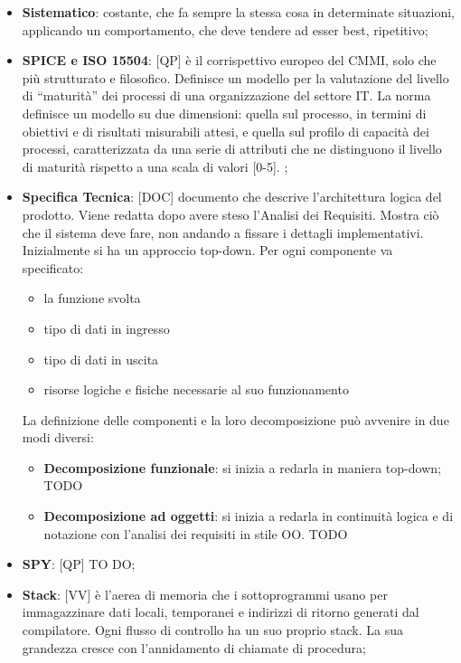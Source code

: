 \begin{itemize}
	\item \textbf{Sistematico}: costante, che fa sempre la stessa cosa in determinate situazioni, applicando un comportamento, che deve tendere ad esser best, ripetitivo;
	\item \textbf{SPICE e ISO 15504}: [QP] è il corrispettivo europeo del CMMI, solo che più strutturato e filosofico. Definisce un modello per la valutazione del livello di ``maturità'' dei processi di una organizzazione del settore IT. \newline
	La norma definisce un modello su due dimensioni: quella sul processo, in termini di obiettivi e di risultati misurabili attesi, e quella sul profilo di capacità dei processi, caratterizzata da una serie di attributi che ne distinguono il livello di maturità rispetto a una scala di valori [0-5]. ;


	\item \textbf{Specifica Tecnica}: [DOC] documento che descrive l'architettura logica del prodotto. Viene redatta dopo avere steso l'Analisi dei Requisiti. Mostra ciò che il sistema deve fare, non andando a fissare i dettagli implementativi. Inizialmente si ha un approccio top-down. Per ogni componente va specificato:
		\begin{itemize}
			\item la funzione svolta
			\item tipo di dati in ingresso
			\item tipo di dati in uscita
			\item risorse logiche e fisiche necessarie al suo funzionamento
		\end{itemize}
		\noindent
		La definizione delle componenti e la loro decomposizione può avvenire in due modi diversi:
		\begin{itemize}
			\item \textbf{Decomposizione funzionale}: si inizia a redarla in maniera top-down; TODO
			\item \textbf{Decomposizione ad oggetti}: si inizia a redarla in continuità logica e di notazione con l'analisi dei requisiti in stile OO. TODO
		\end{itemize}


	\item \textbf{SPY}: [QP] TO DO;

	\item \textbf{Stack}: [VV] è l'aerea di memoria che i sottoprogrammi usano per immagazzinare dati locali, temporanei e indirizzi di ritorno generati dal compilatore. Ogni flusso di controllo ha un suo proprio stack. La sua grandezza cresce con l'annidamento di chiamate di procedura;


\end{itemize}
